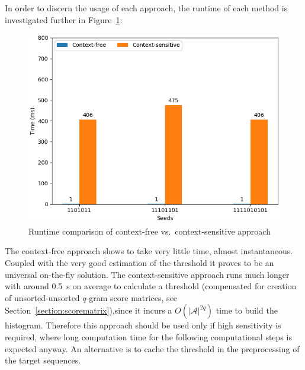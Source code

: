 \documentclass[twoside,a4paper,bsc]{master}
\newcommand{\Qgram}[1]{\(#1\)-gram}
\newcommand{\Alpha}[0]{\mathcal{A}}
\begin{document}
In order to discern the usage of each approach, the runtime
of each method is investigated further in Figure~\ref{fig:sens_runtime}:
\begin{figure}
\centering
\includegraphics[scale=0.6]{graphics/speed_threshold.png}
\caption{Runtime comparison of context-free vs.\ context-sensitive
approach}
\label{fig:sens_runtime}
\end{figure}
The context-free approach shows to take very little time, almost
instantaneous.
Coupled with the very good estimation of the threshold it proves to be an
universal on-the-fly solution. The context-sensitive approach runs much longer
with around 0.5~s on average to calculate a threshold (compensated for
creation of unsorted-unsorted \Qgram{q} score matrices, see
Section~\ref{section:scorematrix}),since it incurs a \(O(|\Alpha|^{2q})\)
time to build the histogram. Therefore this approach should be used only if
high sensitivity is required, where long computation time for the following
computational steps is expected anyway. An alternative is to cache the
threshold in the preprocessing of the target sequences.
\end{document}
